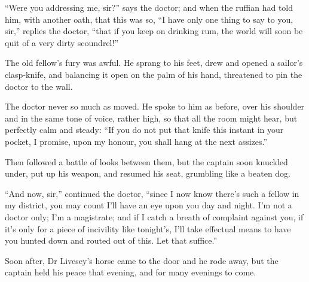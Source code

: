 \enquote{Were you addressing me, sir?} says the doctor; and when the ruffian had told him, with another oath, that this was so, \enquote{I have only one thing to say to you, sir,} replies the doctor, \enquote{that if you keep on drinking rum, the world will soon be quit of a very dirty scoundrel!}

The old fellow’s fury was awful. He sprang to his feet, drew and opened a sailor’s clasp-knife, and balancing it open on the palm of his hand, threatened to pin the doctor to the wall.

The doctor never so much as moved. He spoke to him as before, over his shoulder and in the same tone of voice, rather high, so that all the room might hear, but perfectly calm and steady: \enquote{If you do not put that knife this instant in your pocket, I promise, upon my honour, you shall hang at the next assizes.}


Then followed a battle of looks between them, but the captain soon knuckled under, put up his weapon, and resumed his seat, grumbling like a beaten dog.

\enquote{And now, sir,} continued the doctor, \enquote{since I now know there’s such a fellow in my district, you may count I’ll have an eye upon you day and night. I’m not a doctor only; I’m a magistrate; and if I catch a breath of complaint against you, if it’s only for a piece of incivility like tonight’s, I’ll take effectual means to have you hunted down and routed out of this. Let that suffice.}

Soon after, Dr Livesey’s horse came to the door and he rode away, but the captain held his peace that evening, and for many evenings to come.
